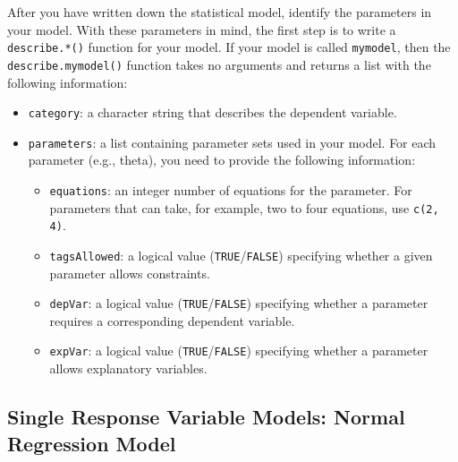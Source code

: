 After you have written down the statistical model, identify the
parameters in your model.  With these parameters in mind, the first
step is to write a {\tt describe.*()} function for your model.  If
your model is called {\tt mymodel}, then the {\tt describe.mymodel()}
function takes no arguments and returns a list with the following
information:
\begin{itemize}
\item {\tt category}: a character string that describes the dependent
variable.
\item {\tt parameters}:  a list containing parameter sets used in your
model.  For each parameter (e.g., theta), you need to provide the
following information:  

\begin{itemize}

\item {\tt equations}: an integer number of equations for the
parameter.  For parameters that can take, for example, two to four
equations, use {\tt c(2, 4)}.  

\item {\tt tagsAllowed}: a logical value ({\tt TRUE}/{\tt FALSE})
specifying whether a given parameter allows constraints.  

\item {\tt depVar}: a logical value ({\tt TRUE}/{\tt FALSE})
specifying whether a parameter requires a corresponding dependent
variable.  

\item {\tt expVar}: a logical value ({\tt TRUE}/{\tt FALSE})
specifying whether a parameter allows explanatory variables.  

\end{itemize}
\end{itemize}

\subsection{Single Response Variable Models: Normal Regression Model}
\label{normal.regression}

